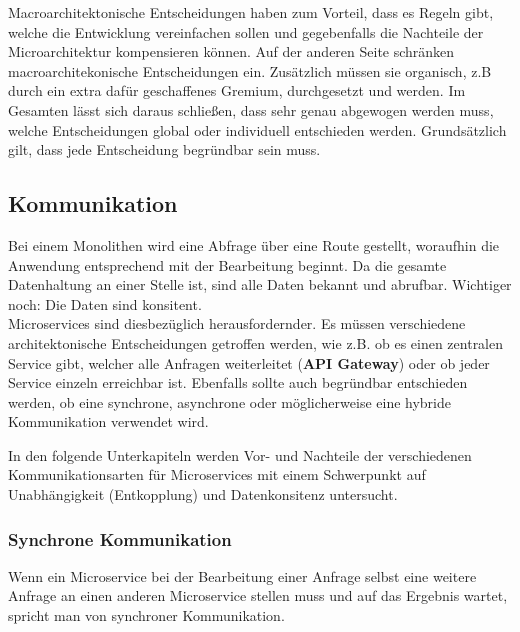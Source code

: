 Macroarchitektonische Entscheidungen haben zum Vorteil, dass es Regeln gibt, welche die Entwicklung vereinfachen sollen und gegebenfalls die Nachteile der Microarchitektur kompensieren können. Auf der anderen Seite schränken macroarchitekonische Entscheidungen ein. Zusätzlich müssen sie organisch, z.B durch ein extra dafür geschaffenes Gremium, durchgesetzt und werden.\cite{wolff2018mic_praxis} Im Gesamten lässt sich daraus schließen, dass sehr genau abgewogen werden muss, welche Entscheidungen global oder individuell entschieden werden. Grundsätzlich gilt, dass jede Entscheidung begründbar sein muss.    

\subsection{Kommunikation}

Bei einem Monolithen wird eine Abfrage über eine Route gestellt, woraufhin die Anwendung entsprechend mit der Bearbeitung beginnt. Da die gesamte Datenhaltung an einer Stelle ist, sind alle Daten bekannt und abrufbar. Wichtiger noch: Die Daten sind konsitent. \\

Microservices sind diesbezüglich herausfordernder. Es müssen verschiedene architektonische Entscheidungen getroffen werden, wie z.B. ob es einen zentralen Service gibt, welcher alle Anfragen weiterleitet (\textbf{API Gateway}) oder ob jeder Service einzeln erreichbar ist. Ebenfalls sollte auch begründbar entschieden werden, ob eine synchrone,  asynchrone oder möglicherweise eine hybride Kommunikation verwendet wird. 

In den folgende Unterkapiteln werden Vor- und Nachteile der verschiedenen Kommunikationsarten für Microservices mit einem Schwerpunkt auf Unabhängigkeit (Entkopplung) und Datenkonsitenz untersucht.


\subsubsection{Synchrone Kommunikation}

Wenn ein Microservice bei der Bearbeitung einer Anfrage selbst eine weitere Anfrage an einen anderen Microservice stellen muss und auf das Ergebnis wartet, spricht man von synchroner Kommunikation.\cite{wolff2018mic_praxis} 

